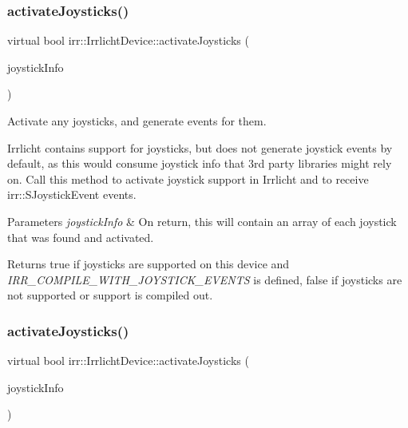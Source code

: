 \subsubsection{\texorpdfstring{activate\+Joysticks()}{activateJoysticks()}\hspace{0.1cm}{\footnotesize\ttfamily [2/3]}}
{\footnotesize\ttfamily virtual bool irr\+::\+Irrlicht\+Device\+::activate\+Joysticks (\begin{DoxyParamCaption}\item[{\hyperlink{classirr_1_1core_1_1array}{core\+::array}$<$ \hyperlink{structirr_1_1SJoystickInfo}{S\+Joystick\+Info} $>$ \&}]{joystick\+Info }\end{DoxyParamCaption})\hspace{0.3cm}{\ttfamily [pure virtual]}}



Activate any joysticks, and generate events for them. 

Irrlicht contains support for joysticks, but does not generate joystick events by default, as this would consume joystick info that 3rd party libraries might rely on. Call this method to activate joystick support in Irrlicht and to receive irr\+::\+S\+Joystick\+Event events. 
\begin{DoxyParams}{Parameters}
{\em joystick\+Info} & On return, this will contain an array of each joystick that was found and activated. \\
\hline
\end{DoxyParams}
\begin{DoxyReturn}{Returns}
true if joysticks are supported on this device and {\itshape I\+R\+R\+\_\+\+C\+O\+M\+P\+I\+L\+E\+\_\+\+W\+I\+T\+H\+\_\+\+J\+O\+Y\+S\+T\+I\+C\+K\+\_\+\+E\+V\+E\+N\+TS} is defined, false if joysticks are not supported or support is compiled out. 
\end{DoxyReturn}
\mbox{\label{classirr_1_1IrrlichtDevice_af06f8d2c4fdffd1f879e46685bcbc6e3}} 
\subsubsection{\texorpdfstring{activate\+Joysticks()}{activateJoysticks()}\hspace{0.1cm}{\footnotesize\ttfamily [3/3]}}
{\footnotesize\ttfamily virtual bool irr\+::\+Irrlicht\+Device\+::activate\+Joysticks (\begin{DoxyParamCaption}\item[{\hyperlink{classirr_1_1core_1_1array}{core\+::array}$<$ \hyperlink{structirr_1_1SJoystickInfo}{S\+Joystick\+Info} $>$ \&}]{joystick\+Info }\end{DoxyParamCaption})\hspace{0.3cm}{\ttfamily [pure virtual]}}



